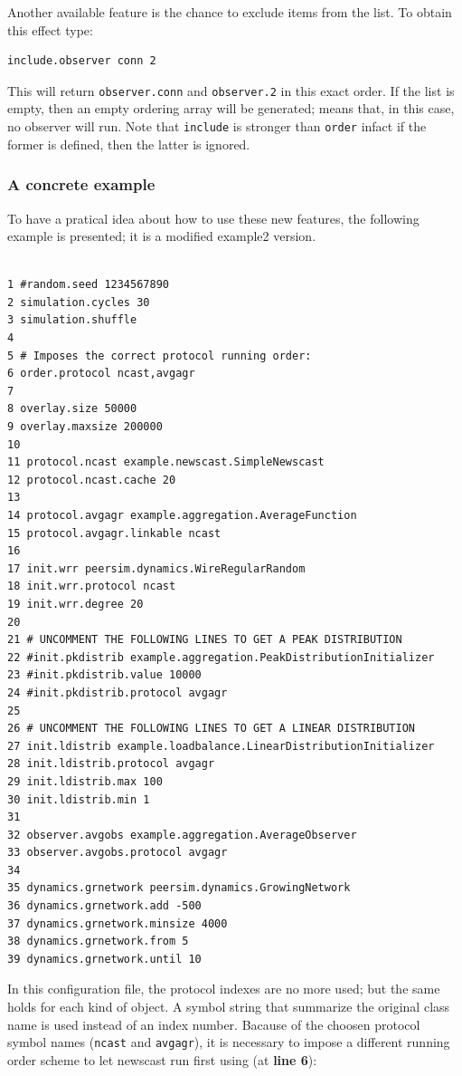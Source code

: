 \documentclass[a4paper,11pt]{article}
\begin{document}
Another available feature is the chance to exclude items from the
list. To obtain this effect type:

\begin{verbatim}
include.observer conn 2
\end{verbatim}

This will return \texttt{observer.conn} and \texttt{observer.2} in this 
exact order. If the list is empty, then an empty ordering array will be
generated; means that, in this case, no observer will run. Note that 
\texttt{include} is stronger than \texttt{order}
infact if the former is defined, then the latter is ignored.
 
\subsubsection{A concrete example}

To have a pratical idea about how to use these new features, the following
example is presented; it is a modified example2 version.

\footnotesize
\begin{verbatim}

1 #random.seed 1234567890
2 simulation.cycles 30
3 simulation.shuffle
4
5 # Imposes the correct protocol running order:
6 order.protocol ncast,avgagr
7
8 overlay.size 50000
9 overlay.maxsize 200000
10 
11 protocol.ncast example.newscast.SimpleNewscast
12 protocol.ncast.cache 20
13
14 protocol.avgagr example.aggregation.AverageFunction
15 protocol.avgagr.linkable ncast
16
17 init.wrr peersim.dynamics.WireRegularRandom
18 init.wrr.protocol ncast
19 init.wrr.degree 20
20
21 # UNCOMMENT THE FOLLOWING LINES TO GET A PEAK DISTRIBUTION
22 #init.pkdistrib example.aggregation.PeakDistributionInitializer
23 #init.pkdistrib.value 10000
24 #init.pkdistrib.protocol avgagr
25
26 # UNCOMMENT THE FOLLOWING LINES TO GET A LINEAR DISTRIBUTION
27 init.ldistrib example.loadbalance.LinearDistributionInitializer
28 init.ldistrib.protocol avgagr
29 init.ldistrib.max 100
30 init.ldistrib.min 1
31
32 observer.avgobs example.aggregation.AverageObserver
33 observer.avgobs.protocol avgagr
34
35 dynamics.grnetwork peersim.dynamics.GrowingNetwork
36 dynamics.grnetwork.add -500
37 dynamics.grnetwork.minsize 4000
38 dynamics.grnetwork.from 5
39 dynamics.grnetwork.until 10
\end{verbatim}
\normalsize

In this configuration file, the protocol indexes are no more used; 
but the same holds for each kind of object. A symbol string that
summarize the original class name is used instead of an index number.
Bacause of the choosen protocol symbol names (\texttt{ncast} and 
\texttt{avgagr}),
it is necessary to impose a different running order scheme to let
newscast run first using (at \textbf{line 6}):
\end{document}
